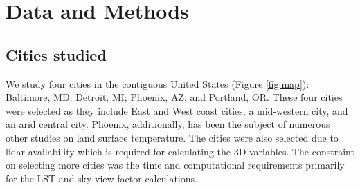 \documentclass[final,3p,times,onecolumn,sort&compress]{elsarticle}
\begin{document}
\section{Data and Methods}
\subsection{Cities studied}
We study four cities in the contiguous United States (Figure \ref{fig:map}): Baltimore, MD; Detroit, MI; Phoenix, AZ; and Portland, OR. 
These four cities were selected as they include East and West coast cities, a mid-western city, and an arid central city. 
Phoenix, additionally, has been the subject of numerous other studies on land surface temperature. 
The cities were also selected due to lidar availability which is required for calculating the 3D variables. 
The constraint on selecting more cities was the time and computational requirements primarily for the LST and sky view factor calculations. 
\end{document}
